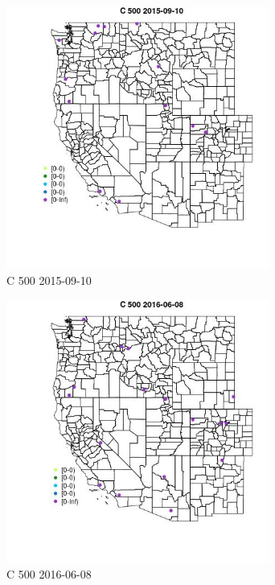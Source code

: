 \begin{figure} 
\centering  
\includegraphics[width=0.77\textwidth]{Code_Outputs/Report_ML_input_PM25_Step4_part_e_de_duplicated_aves_MapObsC_5002015-09-10.jpg} 
\caption{\label{fig:Report_ML_input_PM25_Step4_part_e_de_duplicated_avesMapObsC_5002015-09-10}C 500 2015-09-10} 
\end{figure} 
 

\clearpage 

\begin{figure} 
\centering  
\includegraphics[width=0.77\textwidth]{Code_Outputs/Report_ML_input_PM25_Step4_part_e_de_duplicated_aves_MapObsC_5002016-06-08.jpg} 
\caption{\label{fig:Report_ML_input_PM25_Step4_part_e_de_duplicated_avesMapObsC_5002016-06-08}C 500 2016-06-08} 
\end{figure} 
 


